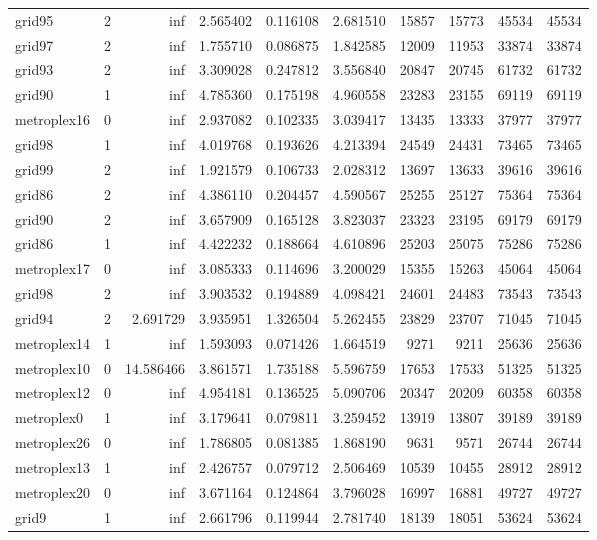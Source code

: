 \begin{longtable}{|l|r|r|r|r|r|r|r|r|r|}
grid95 & 2 & inf & 2.565402 & 0.116108 & 2.681510 & 15857 & 15773 & 45534 & 45534 \\
grid97 & 2 & inf & 1.755710 & 0.086875 & 1.842585 & 12009 & 11953 & 33874 & 33874 \\
grid93 & 2 & inf & 3.309028 & 0.247812 & 3.556840 & 20847 & 20745 & 61732 & 61732 \\
grid90 & 1 & inf & 4.785360 & 0.175198 & 4.960558 & 23283 & 23155 & 69119 & 69119 \\
metroplex16 & 0 & inf & 2.937082 & 0.102335 & 3.039417 & 13435 & 13333 & 37977 & 37977 \\
grid98 & 1 & inf & 4.019768 & 0.193626 & 4.213394 & 24549 & 24431 & 73465 & 73465 \\
grid99 & 2 & inf & 1.921579 & 0.106733 & 2.028312 & 13697 & 13633 & 39616 & 39616 \\
grid86 & 2 & inf & 4.386110 & 0.204457 & 4.590567 & 25255 & 25127 & 75364 & 75364 \\
grid90 & 2 & inf & 3.657909 & 0.165128 & 3.823037 & 23323 & 23195 & 69179 & 69179 \\
grid86 & 1 & inf & 4.422232 & 0.188664 & 4.610896 & 25203 & 25075 & 75286 & 75286 \\
metroplex17 & 0 & inf & 3.085333 & 0.114696 & 3.200029 & 15355 & 15263 & 45064 & 45064 \\
grid98 & 2 & inf & 3.903532 & 0.194889 & 4.098421 & 24601 & 24483 & 73543 & 73543 \\
grid94 & 2 & 2.691729 & 3.935951 & 1.326504 & 5.262455 & 23829 & 23707 & 71045 & 71045 \\
metroplex14 & 1 & inf & 1.593093 & 0.071426 & 1.664519 & 9271 & 9211 & 25636 & 25636 \\
metroplex10 & 0 & 14.586466 & 3.861571 & 1.735188 & 5.596759 & 17653 & 17533 & 51325 & 51325 \\
metroplex12 & 0 & inf & 4.954181 & 0.136525 & 5.090706 & 20347 & 20209 & 60358 & 60358 \\
metroplex0 & 1 & inf & 3.179641 & 0.079811 & 3.259452 & 13919 & 13807 & 39189 & 39189 \\
metroplex26 & 0 & inf & 1.786805 & 0.081385 & 1.868190 & 9631 & 9571 & 26744 & 26744 \\
metroplex13 & 1 & inf & 2.426757 & 0.079712 & 2.506469 & 10539 & 10455 & 28912 & 28912 \\
metroplex20 & 0 & inf & 3.671164 & 0.124864 & 3.796028 & 16997 & 16881 & 49727 & 49727 \\
grid9 & 1 & inf & 2.661796 & 0.119944 & 2.781740 & 18139 & 18051 & 53624 & 53624 \\

\end{longtable}
